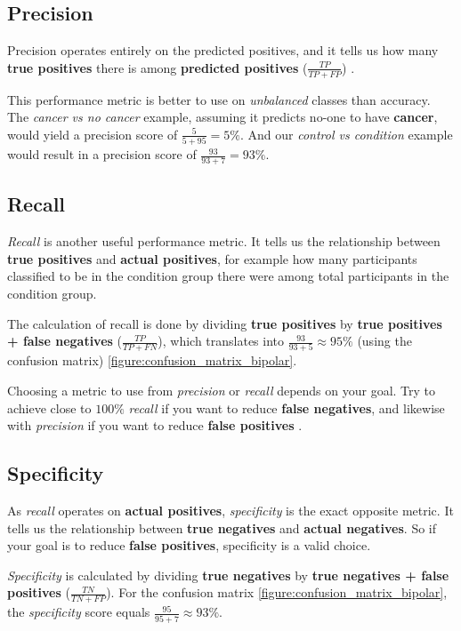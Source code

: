 \subsection{Precision} 

Precision operates entirely on the predicted positives, and it tells us how many \textbf{true positives} there is among \textbf{predicted positives} ($ \frac{TP}{TP + FP} $) \cite{ml_metrics}. 

This performance metric is better to use on \textit{unbalanced} classes than accuracy. The \textit{cancer vs no cancer} example, assuming it predicts no-one to have \textbf{cancer}, would yield a precision score of $ \frac{5}{5+95} = 5\% $. And our \textit{control vs condition} example would result in a precision score of $ \frac{93}{93+7} = 93\% $.

\subsection{Recall}

\textit{Recall} is another useful performance metric. It tells us the relationship between \textbf{true positives} and \textbf{actual positives}, for example how many participants classified to be in the condition group there were among total participants in the condition group.

The calculation of recall is done by dividing \textbf{true positives} by \textbf{true positives + false negatives} ($ \frac{TP}{TP+FN} $), which translates into $ \frac{93}{93+5} \approx 95\% $ (using the confusion matrix) \ref{figure:confusion_matrix_bipolar}.

Choosing a metric to use from \textit{precision} or \textit{recall} depends on your goal. Try to achieve close to $ 100\% $ \textit{recall} if you want to reduce \textbf{false negatives}, and likewise with \textit{precision} if you want to reduce \textbf{false positives} \cite{ml_metrics}.

\subsection{Specificity}

As \textit{recall} operates on \textbf{actual positives}, \textit{specificity} is the exact opposite metric. It tells us the relationship between \textbf{true negatives} and \textbf{actual negatives}. So if your goal is to reduce \textbf{false positives}, specificity is a valid choice.

\textit{Specificity} is calculated by dividing \textbf{true negatives} by \textbf{true negatives + false positives} ($ \frac{TN}{TN+FP} $). For the confusion matrix \ref{figure:confusion_matrix_bipolar}, the \textit{specificity} score equals $ \frac{95}{95+7} \approx 93\% $.

